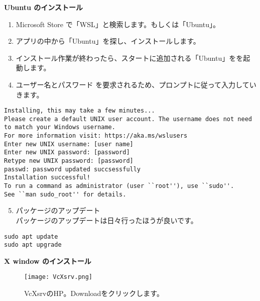 \vspace{1cm}
{\large \bf Ubuntu のインストール}
\vspace{0.5cm}

\begin{enumerate}
  \item Microsoft Store で「WSL」と検索します。もしくは「Ubuntu」。
  \item アプリの中から「Ubuntu」を探し、インストールします。
  \item インストール作業が終わったら、スタートに追加される「Ubuntu」をを起動します。
  \item ユーザー名とパスワード を要求されるため、プロンプトに従って入力していきます。
\end{enumerate}
\begin{lstlisting}[caption=表示されるスクリプト例]
Installing, this may take a few minutes...
Please create a default UNIX user account. The username does not need to match your Windows username.
For more information visit: https://aka.ms/wslusers
Enter new UNIX username: [user name]
Enter new UNIX password: [password]
Retype new UNIX password: [password]
passwd: password updated succsessfully
Installation successful!
To run a command as administrator (user ``root''), use ``sudo''.
See ``man sudo_root'' for details.
\end{lstlisting}

\begin{enumerate}
  \setcounter{enumi}{4}
  \item パッケージのアップデート\\
        パッケージのアップデートは日々行ったほうが良いです。
\end{enumerate}
\begin{lstlisting}
sudo apt update
sudo apt upgrade
\end{lstlisting}

\vspace{1cm}
{\large \bf X window のインストール}
\vspace{0.5cm}

\begin{figure}[h]
  \begin{center}
    \texttt{[image: VcXsrv.png]}
    \caption{VcXsrvのHP。Downloadをクリックします。}
  \end{center}
\end{figure}

